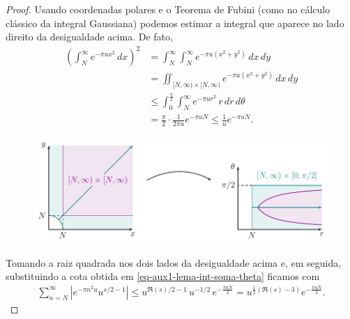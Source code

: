 \begin{proof}
        Usando coordenadas polares e o Teorema de Fubini (como no cálculo clássico da integral Gaussiana) podemos estimar a integral que aparece no lado direito da desigualdade acima. De fato, 
        \begin{align}
        \label{eq-aux2-lema-int-soma-theta}
        \left(
        \int_{N}^{\infty} e^{-\pi u x^2}\, dx
        \right)^2
        &=
        \int_{N}^{\infty}\int_{N}^{\infty}
        e^{-\pi u (x^2+y^2)}\, dx\,dy
        \nonumber\\[0.3cm]
        &=
        \iint_{[N,\infty)\times [N,\infty)}
        e^{-\pi u (x^2+y^2)}\, dx\,dy
        \nonumber\\[0.3cm]
        &\leqslant 
        \int_{0}^{\frac{\pi}{2}}
        \int_{N}^{\infty}
        e^{-\pi u r^2}\, r\,dr\,d\theta
        \nonumber\\[0.3cm]
        &=
        \frac{\pi}{2}\cdot\frac{1}{2\pi u} 
        e^{-\pi u N}
        \leqslant
        \frac{1}{u}e^{-\pi u N}.
        \end{align}
    \begin{figure}[H]\centering
        \includegraphics{Figuras/mudança de variável.pdf}
    \end{figure}
    Tomando a raiz quadrada nos dois lados da desigualdade acima e, em seguida, substituindo a cota obtida em \eqref{eq-aux1-lema-int-soma-theta} 
    ficamos com 
    \begin{align}
    \label{eq-aux3-lema-int-soma-theta}
    \sum_{n=N}^{\infty} 
    |e^{-\pi n^2u}u^{s/2 - 1}|
    \leqslant
    u^{\Re(s)/2 - 1}
    \, u^{-1/2}\, 
    e^{-\frac{\pi u N}{2}}
    =
    u^{\frac{1}{2}(\Re(s)-3)}
    e^{-\frac{\pi u N}{2}}.
    \end{align}


\end{proof}
